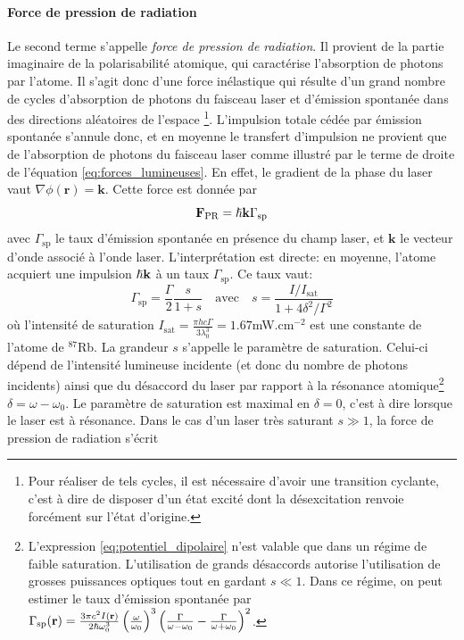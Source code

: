 \paragraph*{Force de pression de radiation}
Le second terme s'appelle \emph{force de pression de radiation}. Il provient de la partie imaginaire de la polarisabilité atomique, qui caractérise l'absorption de photons par l'atome. Il s'agit donc d'une force inélastique qui résulte d'un grand nombre de cycles d'absorption de photons du faisceau laser et d'émission spontanée dans des directions aléatoires de l'espace \footnote{Pour réaliser de tels cycles, il est nécessaire d'avoir une transition cyclante, c'est à dire de disposer d'un état excité dont la désexcitation renvoie forcément sur l'état d'origine.}. L'impulsion totale cédée par émission spontanée s'annule donc, et en moyenne le transfert d'impulsion ne provient que de l'absorption de photons du faisceau laser comme illustré par le terme de droite de l'équation \ref{eq:forces_lumineuses}. En effet, le gradient de la phase du laser vaut $\nabla \phi (\mathbf{r})=\mathbf{k}$. Cette force est donnée par
\begin{equation}
\mathbf{F}_{\mathrm{PR}}=\hslash \mathbf{k} \Gamma_{\mathrm{sp}} 
\end{equation}
avec $\Gamma_{\mathrm{sp}}$ le taux d'émission spontanée en présence du champ laser, et $\mathbf{k}$ le vecteur d'onde associé à l'onde laser. L'interprétation est directe: en moyenne, l'atome acquiert une impulsion $\hslash \mathbf{k}$ à un taux $\Gamma_{\mathrm{sp}}$. Ce taux vaut:
\begin{equation}
\Gamma_{\mathrm{sp}}=\frac{\Gamma}{2} \frac{s}{1+s} \quad \text{avec} \quad s=\frac{I/I_{\mathrm{sat}}}{1+4\delta^2/\Gamma^2}
\end{equation}
où l'intensité de saturation $I_{\mathrm{sat}}=\frac{\pi h c \Gamma}{3\lambda_0^3}=1.67$mW.cm${}^{-2}$ est une constante de l'atome de ${}^{87}$Rb. La grandeur $s$ s'appelle le paramètre de saturation. Celui-ci dépend de l'intensité lumineuse incidente (et donc du nombre de photons incidents) ainsi que du désaccord du laser par rapport à la résonance atomique\footnote{L'expression \ref{eq:potentiel_dipolaire} n'est valable que dans un régime de faible saturation. L'utilisation de grands désaccords autorise l'utilisation de grosses puissances optiques tout en gardant $s\ll 1$. Dans ce régime, on peut estimer le taux d'émission spontanée par $\Gamma_{\mathrm{sp}}(\mathbf{r})=\frac{3 \pi c^2 I(\mathbf{r})}{2\hslash \omega_0^3} \left( \frac{\omega}{\omega_0}\right)^3 \left( \frac{\Gamma}{\omega-\omega_0}-\frac{\Gamma}{\omega+\omega_0} \right)^2$.} $\delta = \omega-\omega_0$.  Le paramètre de saturation est maximal en $\delta=0$, c'est à dire lorsque le laser est à résonance. Dans le cas d'un laser très saturant $s \gg 1$, la force de pression de radiation s'écrit
